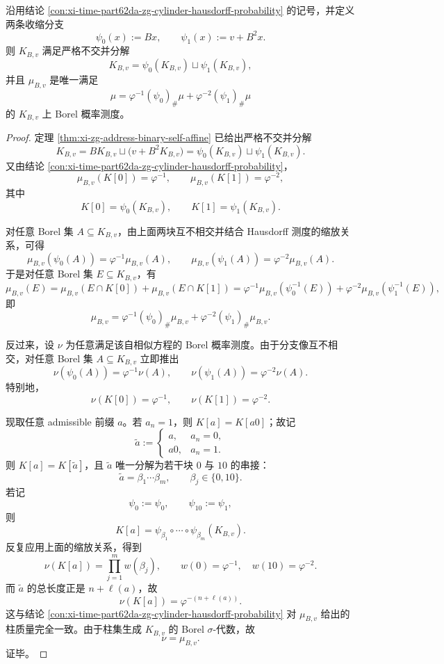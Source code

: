 \begin{conclusion}\label{con:xi-time-part62da-zg-unique-golden-conformal-measure}
沿用结论 \ref{con:xi-time-part62da-zg-cylinder-hausdorff-probability} 的记号，并定义两条收缩分支
\[
\psi_0(x):=Bx,
\qquad
\psi_1(x):=v+B^2x.
\]
则 \(K_{B,v}\) 满足严格不交并分解
\[
K_{B,v}=\psi_0(K_{B,v})\sqcup \psi_1(K_{B,v}),
\]
并且 \(\mu_{B,v}\) 是唯一满足
\[
\mu
=
\varphi^{-1}(\psi_0)_\#\mu+\varphi^{-2}(\psi_1)_\#\mu
\]
的 \(K_{B,v}\) 上 Borel 概率测度。
\end{conclusion}
\begin{proof}
定理 \ref{thm:xi-zg-address-binary-self-affine} 已给出严格不交并分解
\[
K_{B,v}=BK_{B,v}\sqcup\bigl(v+B^2K_{B,v}\bigr)
=
\psi_0(K_{B,v})\sqcup \psi_1(K_{B,v}).
\]
又由结论 \ref{con:xi-time-part62da-zg-cylinder-hausdorff-probability}，
\[
\mu_{B,v}(K[0])=\varphi^{-1},
\qquad
\mu_{B,v}(K[1])=\varphi^{-2},
\]
其中
\[
K[0]=\psi_0(K_{B,v}),
\qquad
K[1]=\psi_1(K_{B,v}).
\]

对任意 Borel 集 \(A\subseteq K_{B,v}\)，由上面两块互不相交并结合 Hausdorff 测度的缩放关系，可得
\[
\mu_{B,v}(\psi_0(A))=\varphi^{-1}\mu_{B,v}(A),
\qquad
\mu_{B,v}(\psi_1(A))=\varphi^{-2}\mu_{B,v}(A).
\]
于是对任意 Borel 集 \(E\subseteq K_{B,v}\)，有
\[
\mu_{B,v}(E)
=
\mu_{B,v}(E\cap K[0])+\mu_{B,v}(E\cap K[1])
=
\varphi^{-1}\mu_{B,v}(\psi_0^{-1}(E))
+\varphi^{-2}\mu_{B,v}(\psi_1^{-1}(E)),
\]
即
\[
\mu_{B,v}
=
\varphi^{-1}(\psi_0)_\#\mu_{B,v}
+\varphi^{-2}(\psi_1)_\#\mu_{B,v}.
\]

反过来，设 \(\nu\) 为任意满足该自相似方程的 Borel 概率测度。由于分支像互不相交，对任意 Borel 集 \(A\subseteq K_{B,v}\) 立即推出
\[
\nu(\psi_0(A))=\varphi^{-1}\nu(A),
\qquad
\nu(\psi_1(A))=\varphi^{-2}\nu(A).
\]
特别地，
\[
\nu(K[0])=\varphi^{-1},
\qquad
\nu(K[1])=\varphi^{-2}.
\]

现取任意 admissible 前缀 \(a\)。若 \(a_n=1\)，则 \(K[a]=K[a0]\)；故记
\[
\widetilde a:=
\begin{cases}
a,& a_n=0,\\
a0,& a_n=1.
\end{cases}
\]
则 \(K[a]=K[\widetilde a]\)，且 \(\widetilde a\) 唯一分解为若干块 \(0\) 与 \(10\) 的串接：
\[
\widetilde a=\beta_1\cdots \beta_m,
\qquad
\beta_j\in\{0,10\}.
\]
若记
\[
\psi_{0}:=\psi_0,
\qquad
\psi_{10}:=\psi_1,
\]
则
\[
K[a]
=
\psi_{\beta_1}\circ\cdots\circ\psi_{\beta_m}(K_{B,v}).
\]
反复应用上面的缩放关系，得到
\[
\nu(K[a])
=
\prod_{j=1}^{m}w(\beta_j),
\qquad
w(0)=\varphi^{-1},
\quad
w(10)=\varphi^{-2}.
\]
而 \(\widetilde a\) 的总长度正是 \(n+\ell(a)\)，故
\[
\nu(K[a])=\varphi^{-(n+\ell(a))}.
\]
这与结论 \ref{con:xi-time-part62da-zg-cylinder-hausdorff-probability} 对 \(\mu_{B,v}\) 给出的柱质量完全一致。由于柱集生成 \(K_{B,v}\) 的 Borel \(\sigma\)-代数，故
\[
\nu=\mu_{B,v}.
\]
证毕。
\end{proof}

